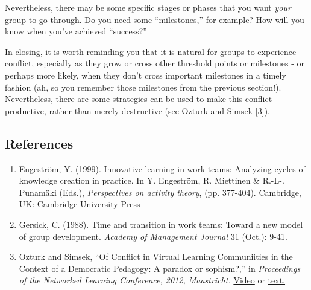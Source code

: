 Nevertheless, there may be some specific stages or phases that you want
\emph{your} group to go through. Do you need some ``milestones,'' for
example? How will you know when you've achieved ``success?''


In closing, it is worth reminding you that it is natural for groups to
experience conflict, especially as they grow or cross other threshold
points or milestones - or perhaps more likely, when they don't cross
important milestones in a timely fashion (ah, so you remember those
milestones from the previous section!). Nevertheless, there are some
strategies can be used to make this conflict productive, rather than
merely destructive (see Ozturk and Simsek {[}3{]}).

\subsection{References}

\begin{enumerate}
\item
  Engeström, Y. (1999). Innovative learning in work teams: Analyzing
  cycles of knowledge creation in practice. In Y. Engeström, R.
  Miettinen \& R.-L-. Punamäki (Eds.), \emph{Perspectives on activity
  theory}, (pp. 377-404). Cambridge, UK: Cambridge University Press
\item
  Gersick, C. (1988). Time and transition in work teams: Toward a new
  model of group development. \emph{Academy of Management Journal} 31
  (Oct.): 9-41.
\item
  Ozturk and Simsek, ``Of Conflict in Virtual Learning Communiities in
  the Context of a Democratic Pedagogy: A paradox or sophism?,'' in
  \emph{Proceedings of the Networked Learning Conference, 2012,
  Maastricht.} \href{http://www.lancaster.ac.uk/fass/edres/seminars/Ozturk300311.htm}{Video} or \href{http://networkedlearningconference.org.uk/abstracts/pdf/ozturk.pdf}{text.}
\end{enumerate}
